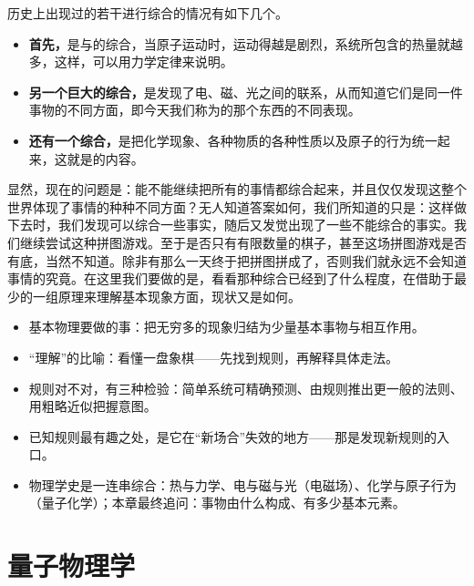 历史上出现过的若干进行综合的情况有如下几个。

\begin{itemize}
  \item \textbf{首先，}是与的综合，当原子运动时，运动得越是剧烈，系统所包含的热量就越多，这样，可以用力学定律来说明。
  \item \textbf{另一个巨大的综合，}是发现了电、磁、光之间的联系，从而知道它们是同一件事物的不同方面，即今天我们称为的那个东西的不同表现。
  \item \textbf{还有一个综合，}是把化学现象、各种物质的各种性质以及原子的行为统一起来，这就是的内容。
\end{itemize}

 显然，现在的问题是：能不能继续把所有的事情都综合起来，并且仅仅发现这整个世界体现了事情的种种不同方面？无人知道答案如何，我们所知道的只是：这样做下去时，我们发现可以综合一些事实，随后又发觉出现了一些不能综合的事实。我们继续尝试这种拼图游戏。至于是否只有有限数量的棋子，甚至这场拼图游戏是否有底，当然不知道。除非有那么一天终于把拼图拼成了，否则我们就永远不会知道事情的究竟。在这里我们要做的是，看看那种综合已经到了什么程度，在借助于最少的一组原理来理解基本现象方面，现状又是如何。


\begin{summarybox}[§2-1 小结]
\begin{itemize}
  \item 基本物理要做的事：把无穷多的现象归结为少量基本事物与相互作用。
  \item “理解”的比喻：看懂一盘象棋——先找到规则，再解释具体走法。
  \item 规则对不对，有三种检验：简单系统可精确预测、由规则推出更一般的法则、用粗略近似把握意图。
  \item 已知规则最有趣之处，是它在“新场合”失效的地方——那是发现新规则的入口。
  \item 物理学史是一连串综合：热与力学、电与磁与光（电磁场）、化学与原子行为（量子化学）；本章最终追问：事物由什么构成、有多少基本元素。
\end{itemize}
\end{summarybox}


\setcounter{section}{2}
\section{量子物理学}

